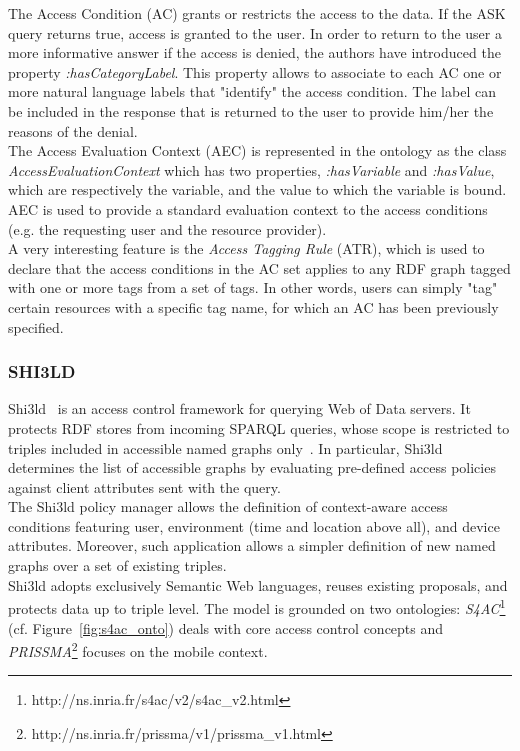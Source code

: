 The Access Condition (AC) grants or restricts the access to the data. If the ASK query returns true, access is granted to the user. In order to return to the user a more informative answer if the access is denied, the authors have introduced the property \textit{:hasCategoryLabel}. This property allows to associate to each AC one or more natural language labels that "identify" the access condition. The label can be included in the response that is returned to the user to provide him/her the reasons of the denial.\\

The Access Evaluation Context (AEC) is represented in the ontology as the class \textit{AccessEvaluationContext} which has two properties, \textit{:hasVariable} and \textit{:hasValue}, which are respectively the variable, and the value to which the variable is bound. AEC is used
to provide a standard evaluation context to the access conditions (e.g. the requesting user and the resource provider).\\

A very interesting feature is the \textit{Access Tagging Rule} (ATR), which is used to declare that the access conditions in the AC set applies to any RDF graph tagged with one or more tags from a set of tags. In other words, users can simply "tag" certain resources with a specific tag name, for which an AC has been previously specified.

\subsubsection{SHI3LD}
Shi3ld~\cite{costabello2012shi3ld} is an access control framework for querying Web of Data servers. It protects RDF stores from incoming SPARQL queries, whose scope is restricted to triples included in accessible named graphs only~\cite{carroll2005named}. In particular, Shi3ld determines the list of accessible graphs by evaluating pre-defined access policies against client attributes sent with the query.\\

The Shi3ld policy manager allows the definition of context-aware access conditions featuring user, environment (time and location above all), and device attributes. Moreover, such application allows a simpler definition of new named graphs over a set of existing triples.\\

Shi3ld adopts exclusively Semantic Web languages, reuses existing proposals, and protects data up to triple level. The model is grounded on two ontologies: \textit{S4AC}\footnote{http://ns.inria.fr/s4ac/v2/s4ac\_v2.html} (cf. Figure~\ref{fig:s4ac_onto}) deals with core access control concepts and \textit{PRISSMA}\footnote{http://ns.inria.fr/prissma/v1/prissma\_v1.html} focuses on the mobile context.\\

